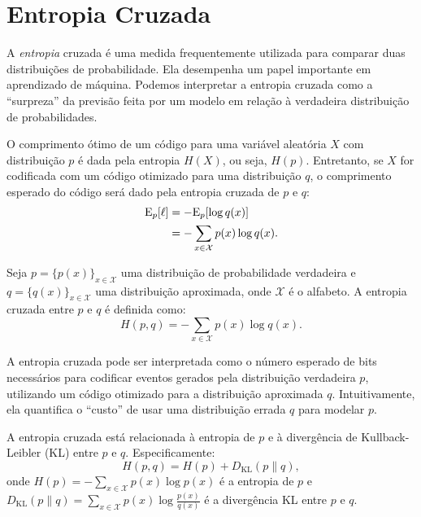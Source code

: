 \section{Entropia Cruzada}

A \emph{entropia} cruzada é uma medida frequentemente utilizada para comparar duas
distribuições de probabilidade. Ela desempenha um papel importante em aprendizado de máquina.
Podemos interpretar a entropia cruzada como a ``surpreza'' da previsão feita por um modelo
em relação à verdadeira distribuição de probabilidades. 

O comprimento ótimo de um código para uma variável aleatória $X$ com
distribuição $p$ é dada pela entropia $H(X)$, ou seja, $H(p)$. Entretanto, se
$X$ for codificada com um código otimizado para uma distribuição $q$, o
comprimento esperado do código será dado pela entropia cruzada de $p$ e $q$:
\begin{subequations}
\begin{align}
\mathrm{E}_p [\ell] &= - \mathrm{E}_p [\log q(x)] \\
            &= - \sum_{x \in \mathcal{X}} p(x) \log q(x) .
\end{align}
\end{subequations}



\begin{definition}
Seja $p = \{ p(x) \}_{x \in \mathcal{X}}$ uma distribuição de probabilidade
verdadeira e $q = \{ q(x) \}_{x \in \mathcal{X}}$ uma distribuição aproximada,
onde $\mathcal{X}$ é o alfabeto. A entropia cruzada entre $p$ e $q$ é definida
como:
\begin{equation}\label{eq:crossentropy}
H(p, q) = - \sum_{x \in \mathcal{X}} p(x) \log q(x) .
\end{equation}
\end{definition}

A entropia cruzada pode ser interpretada como o número esperado de bits
necessários para codificar eventos gerados pela distribuição verdadeira $p$,
utilizando um código otimizado para a distribuição aproximada $q$.
Intuitivamente, ela quantifica o ``custo'' de usar uma distribuição errada $q$
para modelar $p$.

\begin{proposition}
A entropia cruzada está relacionada à entropia de $p$ e à divergência de
Kullback-Leibler (KL) entre $p$ e $q$. Especificamente:
\begin{equation}\label{eq:crossentropykldiv}
H(p, q) = H(p) + D_{\text{KL}}(p \| q),
\end{equation}
onde $H(p) = - \sum_{x \in \mathcal{X}} p(x) \log p(x)$ é a entropia de $p$ e 
$D_{\text{KL}}(p \| q) = \sum_{x \in \mathcal{X}} p(x) \log \frac{p(x)}{q(x)}$ 
é a divergência KL entre $p$ e $q$.
\end{proposition}

